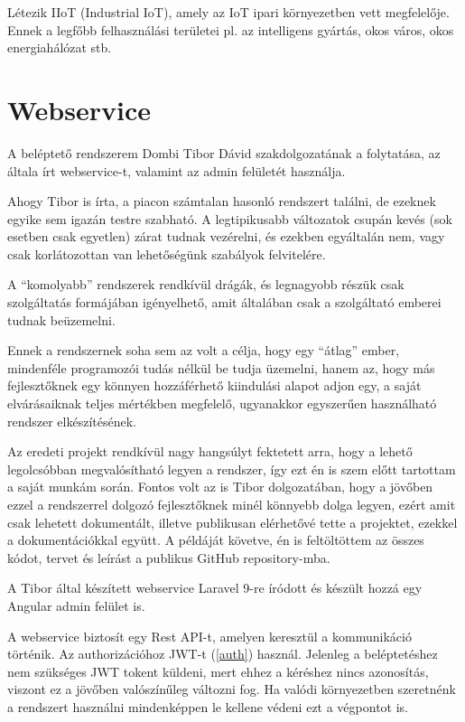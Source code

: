 \documentclass[
]{thesis-ekf}
\theoremstyle{definition}
\theoremstyle{remark}
\begin{document}
Létezik IIoT (Industrial IoT), amely az IoT ipari környezetben vett megfelelője. Ennek a legfőbb felhasználási területei pl. az intelligens gyártás, okos város, okos energiahálózat stb.

\section{Webservice}
A beléptető rendszerem Dombi Tibor Dávid szakdolgozatának a folytatása, az általa írt webservice-t, valamint az admin felületét használja.

Ahogy Tibor is írta, a piacon számtalan hasonló rendszert találni, de ezeknek egyike sem igazán testre szabható. A legtipikusabb változatok csupán kevés (sok esetben csak egyetlen) zárat tudnak vezérelni, és ezekben egyáltalán nem, vagy csak korlátozottan van lehetőségünk szabályok felvitelére. \cite{Dombi}

A \enquote{komolyabb} rendszerek rendkívül drágák, és legnagyobb részük csak szolgáltatás formájában igényelhető, amit általában csak a szolgáltató emberei tudnak beüzemelni.

Ennek a rendszernek soha sem az volt a célja, hogy egy \enquote{átlag} ember, mindenféle programozói tudás nélkül be tudja üzemelni, hanem az, hogy más fejlesztőknek egy könnyen hozzáférhető kiindulási alapot adjon egy, a saját elvárásaiknak teljes mértékben megfelelő, ugyanakkor egyszerűen használható rendszer elkészítésének.

Az eredeti projekt rendkívül nagy hangsúlyt fektetett arra, hogy a lehető legolcsóbban megvalósítható legyen a rendszer, így ezt én is szem előtt tartottam a saját munkám során. Fontos volt az is Tibor dolgozatában, hogy a jövőben ezzel a rendszerrel dolgozó fejlesztőknek minél könnyebb dolga legyen, ezért amit csak lehetett dokumentált, illetve publikusan elérhetővé tette a projektet, ezekkel a dokumentációkkal együtt. \cite{Dombi} A példáját követve, én is feltöltöttem az összes kódot, tervet és leírást a publikus GitHub repository-mba.

A Tibor által készített webservice Laravel 9-re íródott és készült hozzá egy Angular admin felület is.

A webservice biztosít egy Rest API-t, amelyen keresztül a kommunikáció történik. Az authorizációhoz JWT-t (\ref{auth}) használ. Jelenleg a beléptetéshez nem szükséges JWT tokent küldeni, mert ehhez a kéréshez nincs azonosítás, viszont ez a jövőben valószínűleg változni fog. Ha valódi környezetben szeretnénk a rendszert használni mindenképpen le kellene védeni ezt a végpontot is. \cite{Dombi}
\end{document}
